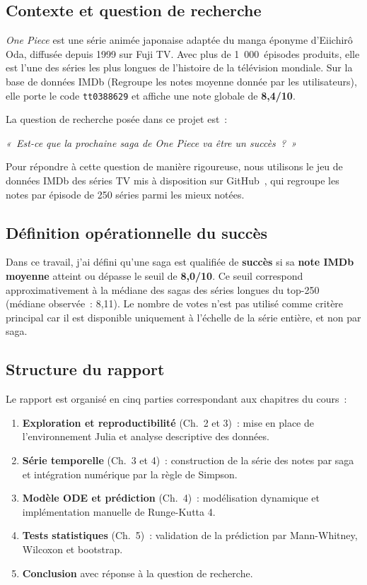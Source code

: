 \documentclass[a4paper,12pt,french]{article}
\newcommand{\code}[1]{\texttt{#1}}
\begin{document}
\subsection{Contexte et question de recherche}

\textit{One Piece} est une série animée japonaise adaptée
du manga éponyme d'Eiichirô Oda, diffusée depuis 1999 sur Fuji TV. Avec plus de
1~000~épisodes produits, elle est l'une des séries les plus longues de l'histoire
de la télévision mondiale. Sur la base de données IMDb (Regroupe les notes moyenne donnée par les utilisateurs), elle porte le code
\code{tt0388629} et affiche une note globale de \textbf{8{,}4/10}.

La question de recherche posée dans ce projet est~:

\begin{center}
\textit{«~Est-ce que la prochaine saga de One Piece va être un succès~?~»}
\end{center}

Pour répondre à cette question de manière rigoureuse, nous utilisons le jeu de
données IMDb des séries TV mis à disposition sur GitHub~\cite{imdb_dataset}, qui
regroupe les notes par épisode de 250 séries parmi les mieux notées.

\subsection{Définition opérationnelle du succès}

Dans ce travail, j'ai défini qu'une saga est qualifiée de \textbf{succès} si sa \textbf{note IMDb
moyenne} atteint ou dépasse le seuil de \textbf{8{,}0/10}. Ce seuil correspond
approximativement à la médiane des sagas des séries longues du top-250 (médiane
observée~: 8{,}11). Le nombre de votes n'est pas utilisé comme critère principal
car il est disponible uniquement à l'échelle de la série entière, et non par saga.

\subsection{Structure du rapport}

Le rapport est organisé en cinq parties correspondant aux chapitres du cours~:
\begin{enumerate}
  \item \textbf{Exploration et reproductibilité} (Ch.~2 et 3)~: mise en place de
        l'environnement Julia et analyse descriptive des données.
  \item \textbf{Série temporelle} (Ch.~3 et 4)~: construction de la série des notes
        par saga et intégration numérique par la règle de Simpson.
  \item \textbf{Modèle ODE et prédiction} (Ch.~4)~: modélisation dynamique et
        implémentation manuelle de Runge-Kutta 4.
  \item \textbf{Tests statistiques} (Ch.~5)~: validation de la prédiction par
        Mann-Whitney, Wilcoxon et bootstrap.
  \item \textbf{Conclusion} avec réponse à la question de recherche.
\end{enumerate}
\end{document}
